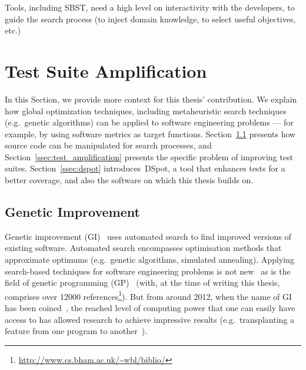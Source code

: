 \documentclass[a4paper,11pt]{sdm_internship}
\newcommand{\addref}[1]{\colorbox{TealBlue!100}{\textcolor{white}{\textbf{$[$\ifx&#1&\ \else#1\fi$]$}}}}
\newcommand{\todo}[1]{\colorbox{Red!75}{\textcolor{white}{\textbf{TODO\ifx&#1&\else: #1\fi}}}}
\newcommand{\dspot}{DSpot\xspace}
\theoremstyle{definition}
\begin{document}
Tools, including SBST, need a high level on interactivity with the developers, to guide the search process (to inject domain knowledge, to select useful objectives, etc.)~\cite{marculescu2017transferring}



\section{Test Suite Amplification}%
\label{sec:test_suite_amplification}
In this Section, we provide more context for this thesis' contribution.
We explain how global optimization techniques, including metaheuristic search techniques (e.g.\ genetic algorithms) can be applied to software engineering problems --- for example, by using software metrics as target functions.
Section~\ref{ssec:genetic_improvement} presents how source code can be manipulated for search processes, and Section~\ref{ssec:test_amplification} presents the specific problem of improving test suites.
Section~\ref{ssec:dspot} introduces~\dspot{}, a tool that enhances tests for a better coverage, and also the software on which this thesis builds on.

\subsection{Genetic Improvement}%
\label{ssec:genetic_improvement}
Genetic improvement (GI)~\cite{petke2017genetic} uses automated search to find improved versions of existing software.
Automated search encompasses optimisation methods that approximate optimums (e.g.\ genetic algorithms, simulated annealing).
Applying search-based techniques for software engineering problems is not new~\cite{mcminn2011search} as is the field of genetic programming (GP)~\cite{koza1994genetic} (with, at the time of writing this thesis, comprises over 12000 references\footnote{\url{http://www.cs.bham.ac.uk/~wbl/biblio/}}).
But from around 2012, when the name of GI has been coined~\cite{harman2012gismoe}, the reached level of computing power that one can easily have access to has allowed research to achieve impressive results (e.g.\ transplanting a feature from one program to another~\cite{barr2015automated}).

\end{document}
